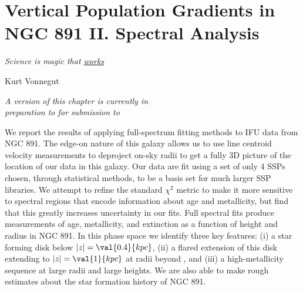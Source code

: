 
\chapter[NGC 891: Full Spectrum Analysis]{Vertical Population Gradients in NGC 891 II. Spectral Analysis}
\label{chap:891_2}
\epigraph{\fixspacing\emph{Science is magic that \underline{works}}}{Kurt Vonnegut}
\vfill
\begin{flushright}
  \fixspacing
  \textit{A version of this chapter is currently in \\
    preparation to for submission to \apj}
\end{flushright}
\vspace{1in}
\cleardoublepage

\begin{chabstract}

  We report the results of applying full-spectrum fitting methods to
  IFU data from NGC 891. The edge-on nature of this galaxy allows us
  to use line centroid velocity measurements to deproject on-sky radii
  to get a fully 3D picture of the location of our data in this
  galaxy. Our data are fit using a set of only 4 SSPs chosen, through
  statistical methods, to be a basis set for much larger SSP
  libraries. We attempt to refine the standard $\chi^2$ metric to make
  it more sensitive to spectral regions that encode information about
  age and metallicity, but find that this greatly increases
  uncertainty in our fits. Full spectral fits produce measurements of
  age, metallicity, and extinction as a function of height and radius
  in NGC 891. In this phase space we identify three key features: (i)
  a star forming disk below $|z| = \val{0.4}{kpc}$, (ii) a flared
  extension of this disk extending to $|z| = \val{1}{kpc}$ at radii
  beyond , and (iii) a high-metallicity sequence at large
  radii and large heights. We are also able to make rough estimates
  about the star formation history of NGC 891.



\end{chabstract}

